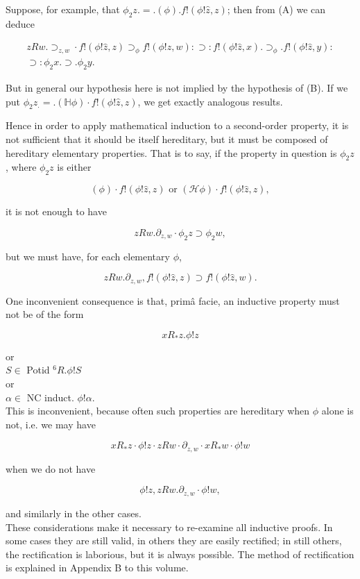 \documentclass[10pt]{article}
\begin{document}
Suppose, for example, that $\phi_{2} z .=.(\phi) . f!(\phi!\hat{z}, z)$; then from (A) we can deduce


\begin{gather*}
z R w . \supset_{z, w} \cdot f!(\phi!\hat{z}, z) \supset_{\phi} f!(\phi!\hat{z}, w): \supset: f!(\phi!\hat{z}, x) . \supset_{\phi} . f!(\phi!\hat{z}, y): \\
\supset: \phi_{2} x . \supset . \phi_{2} y . \tag{C}
\end{gather*}


But in general our hypothesis here is not implied by the hypothesis of (B). If we put $\phi_{2} z_{.}=.(\mathbb{H} \phi) \cdot f!(\phi!\hat{z}, z)$, we get exactly analogous results.

Hence in order to apply mathematical induction to a second-order property, it is not sufficient that it should be itself hereditary, but it must be composed of hereditary elementary properties. That is to say, if the property in question is $\phi_{2} z$, where $\phi_{2} z$ is either

$$
(\phi) \cdot f!(\phi!\hat{z}, z) \text { or }(\mathcal{H} \phi) \cdot f!(\phi!\hat{z}, z),
$$

it is not enough to have

$$
z R w . \partial_{z, w} \cdot \phi_{2} z \supset \phi_{2} w,
$$

but we must have, for each elementary $\phi$,

$$
z R w . \partial_{z, w}, f!(\phi!\hat{z}, z) \supset f!(\phi!\hat{z}, w) .
$$

One inconvenient consequence is that, primâ facie, an inductive property must not be of the form

$$
x R_{*} z . \phi!z
$$

or\\
$S \in$ Potid ${ }^{6} R . \phi!S$\\
or\\
$\alpha \in$ NC induct. $\phi!\alpha$.\\
This is inconvenient, because often such properties are hereditary when $\phi$ alone is not, i.e. we may have

$$
x R_{*} z \cdot \phi!z \cdot z R w \cdot \partial_{z, w} \cdot x R_{*} w \cdot \phi!w
$$

when we do not have

$$
\phi!z, z R w . \partial_{z, w} \cdot \phi!w,
$$

and similarly in the other cases.\\
These considerations make it necessary to re-examine all inductive proofs. In some cases they are still valid, in others they are easily rectified; in still others, the rectification is laborious, but it is always possible. The method of rectification is explained in Appendix B to this volume.
\end{document}
